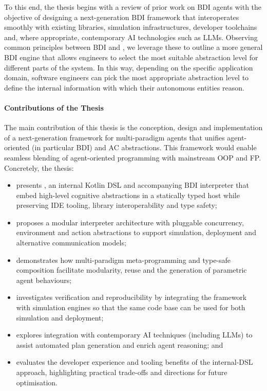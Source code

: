 \documentclass[12pt,a4paper,openright,twoside]{book}
\begin{document}
To this end, 
the thesis begins with a review of prior work on \ac{BDI} agents with the objective of designing a next-generation \ac{BDI} framework that interoperates smoothly with existing libraries, 
simulation infrastructures, 
developer toolchains and, 
where appropriate, 
contemporary \ac{AI} technologies such as \acp{LLM}. 
%
Observing common principles between \ac{BDI} and \mapek{}, 
we leverage these to outline a more general \ac{BDI} engine that allows engineers to select the most suitable abstraction level for different parts of the system.
%
In this way,
depending on the specific application domain,
software engineers can pick the most appropriate abstraction level to define the internal information with which their autonomous entities reason.

\paragraph{Contributions of the Thesis}
The main contribution of this thesis is the conception, 
design and implementation of a next-generation framework 
for multi-paradigm agents that unifies agent-oriented 
(in particular \ac{BDI}) 
and \ac{AC} abstractions.
%
This framework would enable seamless blending of
agent-oriented programming with mainstream \ac{OOP} and \ac{FP}. 
%
Concretely, the thesis:
\begin{itemize}
    \item presents \jakta{}, an internal Kotlin DSL and accompanying \ac{BDI} interpreter that embed high-level cognitive abstractions in a statically typed host while preserving IDE tooling, library interoperability and type safety;
    \item proposes a modular interpreter architecture with pluggable concurrency, environment and action abstractions to support simulation, deployment and alternative communication models;
    \item demonstrates how multi-paradigm meta-programming and type-safe composition facilitate modularity, reuse and the generation of parametric agent behaviours;
    \item investigates verification and reproducibility by integrating the framework with simulation engines so that the same code base can be used for both simulation and deployment;
    \item explores integration with contemporary AI techniques (including \acp{LLM}) to assist automated plan generation and enrich agent reasoning; and
    \item evaluates the developer experience and tooling benefits of the internal-DSL approach, highlighting practical trade-offs and directions for future optimisation.
\end{itemize}
\end{document}
